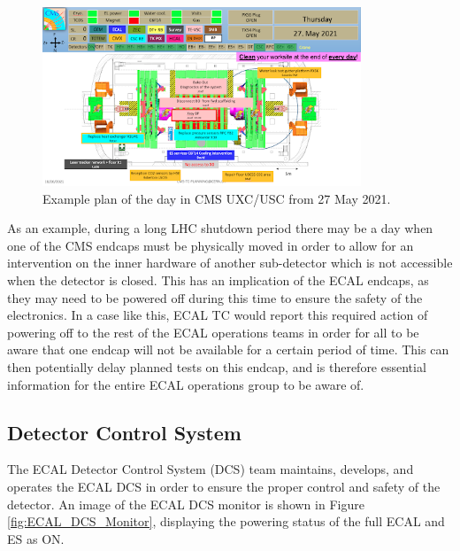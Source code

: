 \begin{figure}[H]
    \centering
    \includegraphics[width=0.85\textwidth]{Images/ECAL_Operations/CMS_TC_Example.png}
    \caption{Example plan of the day in CMS UXC/USC from 27 May 2021.}
    \label{fig:CMS_TC_Example}
\end{figure}

As an example, during a long LHC shutdown period there may be a day when one of the CMS endcaps must be physically moved in order to allow for an intervention on the inner hardware of another sub-detector which is not accessible when the detector is closed. This has an implication of the ECAL endcaps, as they may need to be powered off during this time to ensure the safety of the electronics. In a case like this, ECAL TC would report this required action of powering off to the rest of the ECAL operations teams in order for all to be aware that one endcap will not be available for a certain period of time. This can then potentially delay planned tests on this endcap, and is therefore essential information for the entire ECAL operations group to be aware of. 

\subsection{Detector Control System}


The ECAL Detector Control System (DCS) team maintains, develops, and operates the ECAL DCS in order to ensure the proper control and safety of the detector. An image of the ECAL DCS monitor is shown in Figure \ref{fig:ECAL_DCS_Monitor}, displaying the powering status of the full ECAL and ES as ON. 

